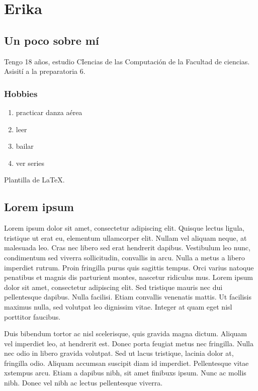 \documentclass{book}
\date{\today}
\begin{document}
\chapter{Erika}

\section{Un poco sobre mí}
Tengo 18 años, estudio CIencias de las Computación de la Facultad de ciencias. Asisití  a la preparatoria 6.

\subsection {Hobbies}
\begin{enumerate}
\item practicar danza aérea
\item leer
\item bailar
 \item ver series 
\end{enumerate}




Plantilla de \LaTeX.

\section{Lorem ipsum}

Lorem ipsum dolor sit amet, consectetur adipiscing elit. Quisque lectus ligula,
tristique ut erat eu, elementum ullamcorper elit. Nullam vel aliquam neque, at
malesuada leo. Cras nec libero sed erat hendrerit dapibus. Vestibulum leo nunc,
condimentum sed viverra sollicitudin, convallis in arcu. Nulla a metus a libero
imperdiet rutrum. Proin fringilla purus quis sagittis tempus. Orci varius
natoque penatibus et magnis dis parturient montes, nascetur ridiculus mus. Lorem
ipsum dolor sit amet, consectetur adipiscing elit. Sed tristique mauris nec dui
pellentesque dapibus. Nulla facilisi. Etiam convallis venenatis mattis. Ut
facilisis maximus nulla, sed volutpat leo dignissim vitae. Integer at quam eget
nisl porttitor faucibus.

Duis bibendum tortor ac nisl scelerisque, quis gravida magna dictum. Aliquam vel
imperdiet leo, at hendrerit est. Donec porta feugiat metus nec fringilla. Nulla
nec odio in libero gravida volutpat. Sed ut lacus tristique, lacinia dolor at,
fringilla odio. Aliquam accumsan suscipit diam id imperdiet. Pellentesque vitae
xstempus arcu. Etiam a dapibus nibh, sit amet finibuxs ipsum. Nunc ac mollis
nibh. Donec vel nibh ac lectus pellentesque viverra.
\end{document}
